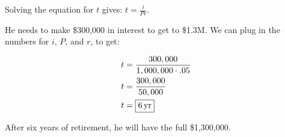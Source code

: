 \documentclass[letterpaper]{exam}
\begin{document}
\begin{questions}
\begin{parts}
          \begin{solution}
            Solving the equation for $t$ gives: $t = \frac{i}{P r}$.  
            
            He needs to make \$300,000 in interest to get to
            \$1.3M.  We can plug in the numbers for $i$, $P$, and $r$, to get:

              \begin{align*}
                t & = \frac{300,000}{1,000,000 \cdot .05}   \\
                t & = \frac{300,000}{50,000}   \\
                t & = \boxed{ \unit[6]{yr} } \\
              \end{align*}

              After six years of retirement, he will have the full \$1,300,000.

          \end{solution}

      \end{parts}





\end{questions}
\end{document}
